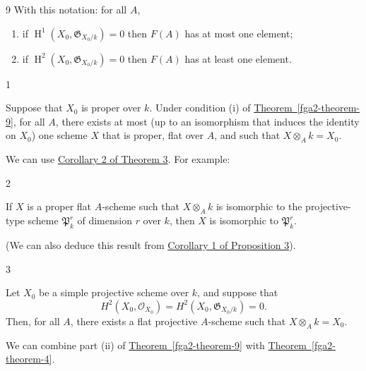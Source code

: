\begin{theorem}{9}
    With this notation: for all \(A\),

    
 \begin{enumerate}
      
 \item[i.]
        if \(\operatorname {H}^1(X_0,\mathfrak {G}_{X_0/k})=0\) then \(F(A)\) has at most one element;
      

      
 \item[ii.]
        if \(\operatorname {H}^2(X_0,\mathfrak {G}_{X_0/k})=0\) then \(F(A)\) has at least one element.
      

    \end{enumerate}\end{theorem}\begin{corollary}{1}\label{fga2-theorem-9-corollary-1}\skipsinglepar\par{}Suppose that \(X_0\) is proper over \(k\).
    Under condition (i) of \hyperref[fga2-theorem-9]{Theorem~\ref*{fga2-theorem-9}}, for all \(A\), there exists at most (up to an isomorphism that induces the identity on \(X_0\)) one scheme \(X\) that is proper, flat over \(A\), and such that \(X\otimes _Ak=X_0\).\end{corollary}\par{}We can use \hyperref[fga2-theorem-3-corollary-2]{Corollary 2 of Theorem 3}.
  For example:\begin{corollary}{2}\label{fga2-theorem-9-corollary-2}\skipsinglepar\par{}If \(X\) is a proper flat \(A\)-scheme such that \(X\otimes _A k\) is isomorphic to the projective-type scheme \(\mathfrak {P}_k^r\) of dimension \(r\) over \(k\), then \(X\) is isomorphic to \(\mathfrak {P}_k^r\).\end{corollary}\par{}(We can also deduce this result from \hyperref[fga2-proposition-3-corollary-1]{Corollary 1 of Proposition 3}).\begin{corollary}{3}\label{fga2-theorem-9-corollary-3}\skipsinglepar\par{}Let \(X_0\) be a simple projective scheme over \(k\), and suppose that
    \[       H^2(X_0,\mathcal {O}_{X_0})       = H^2(X_0,\mathfrak {G}_{X_0/k})       = 0.     \]
    Then, for all \(A\), there exists a flat projective \(A\)-scheme such that \(X\otimes _Ak=X_0\).\end{corollary}\par{}We can combine part (ii) of \hyperref[fga2-theorem-9]{Theorem~\ref*{fga2-theorem-9}} with \hyperref[fga2-theorem-4]{Theorem~\ref*{fga2-theorem-4}}.
